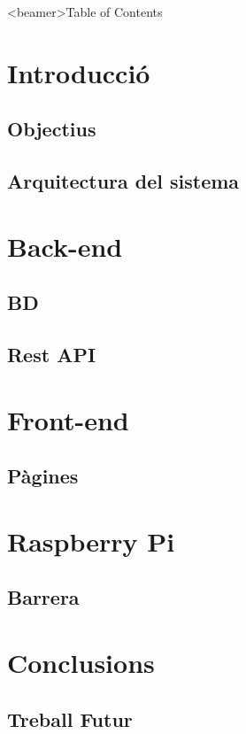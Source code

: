 



\frame{\titlepage}
\begin{frame}<beamer>{Table of Contents}
    \begin{small}
    \tableofcontents[
        subsectionstyle=hide,
    ]
    \end{small}
\end{frame}
\section{Introducció}
\subsection{Objectius}

\subsection{Arquitectura del sistema}

\section{Back-end}
\subsection{BD}

\subsection{Rest API}

\section{Front-end}
\subsection{Pàgines}

\section{Raspberry Pi}
\subsection{Barrera}

\section{Conclusions}
\subsection{Treball Futur}

